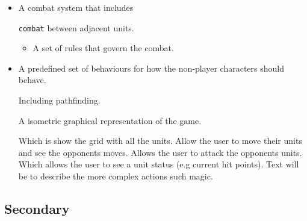 \begin{itemize}
\begin{itemize}
	\item A combat system that includes
		\begin{itemize}
			\tick \texttt{combat} between adjacent units.
			\begin{itemize}
				\tick When the unit hit-points are reduced to zero they are \texttt{defeated} and are removed from the map
			\item A set of rules that govern the combat.
			\end{itemize}
			
		\end{itemize}
	
	\item A predefined set of behaviours for how the non-player characters should behave.
	\begin{itemize}
		\tick Including pathfinding.
	\end{itemize}
	
	\tick A isometric graphical representation of the game.
	\begin{itemize}
		\tick Which is show the grid with all the units.
		\tick Allow the user to move their units and see the opponents moves.
		\tick Allows the user to attack the opponents units.
		\tick Which allows the user to see a unit status (e.g current hit points).
		\tick Text will be to describe the more complex actions such magic.
	\end{itemize}
\end{itemize}
\end{itemize}

\subsection{Secondary}
\label{secondary}

